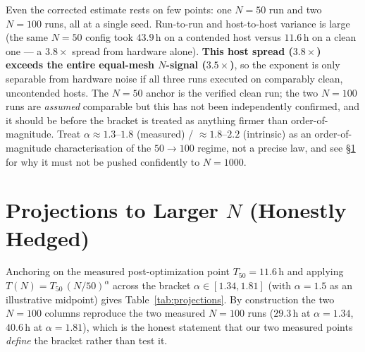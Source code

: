 \documentclass[11pt,a4paper]{article}
\begin{document}
\begin{remark}
Even the corrected estimate rests on few points: one $N=50$ run and two $N=100$
runs, all at a single seed.  Run-to-run and host-to-host variance is large (the
same $N=50$ config took $43.9$\,h on a contended host versus $11.6$\,h on a
clean one --- a $3.8\times$ spread from hardware alone).  \textbf{This host
spread ($3.8\times$) exceeds the entire equal-mesh $N$-signal ($3.5\times$)},
so the exponent is only separable from hardware noise if all three runs
executed on comparably clean, uncontended hosts.  The $N=50$ anchor is the
verified clean run; the two $N=100$ runs are \emph{assumed} comparable but this
has not been independently confirmed, and it should be before the bracket is
treated as anything firmer than order-of-magnitude.  Treat
$\alpha\approx1.3$--$1.8$ (measured) / $\approx1.8$--$2.2$ (intrinsic) as an
order-of-magnitude characterisation of the $50\to100$ regime, not a precise law,
and see \S\ref{sec:projections} for why it must not be pushed confidently to
$N=1000$.
\end{remark}

\section{Projections to Larger $N$ (Honestly Hedged)}
\label{sec:projections}

Anchoring on the measured post-optimization point $T_{50}=11.6$\,h and applying
$T(N)=T_{50}\,(N/50)^{\alpha}$ across the bracket $\alpha\in[1.34,1.81]$ (with
$\alpha=1.5$ as an illustrative midpoint) gives Table~\ref{tab:projections}.
By construction the two $N=100$ columns reproduce the two measured $N=100$ runs
($29.3$\,h at $\alpha=1.34$, $40.6$\,h at $\alpha=1.81$), which is the honest
statement that our two measured points \emph{define} the bracket rather than
test it.
\end{document}
